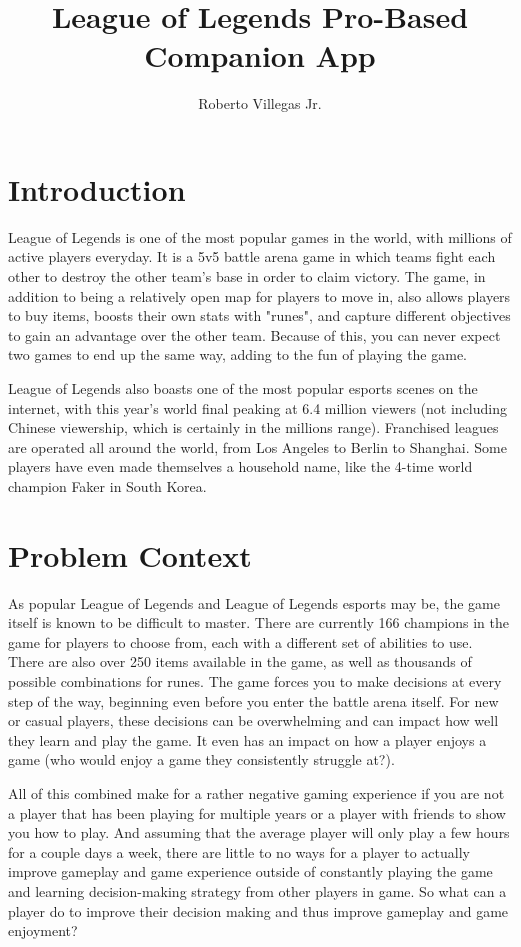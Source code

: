 \documentclass[10pt,twocolumn]{article}
\title{League of Legends Pro-Based Companion App}
\author{Roberto Villegas Jr.}
\affiliation{Occidental College}
\begin{document}
\maketitle

\section{Introduction}

League of Legends is one of the most popular games in the world, with millions of active players everyday.
It is a 5v5 battle arena game in which teams fight each other to destroy the other team's base in order to claim victory.
The game, in addition to being a relatively open map for players to move in, also allows players to buy items, boosts their own stats with "runes", and capture different objectives to gain an advantage over the other team.
Because of this, you can never expect two games to end up the same way, adding to the fun of playing the game.

League of Legends also boasts one of the most popular esports scenes on the internet, with this year's world final peaking at 6.4 million viewers (not including Chinese viewership, which is certainly in the millions range).
Franchised leagues are operated all around the world, from Los Angeles to Berlin to Shanghai.
Some players have even made themselves a household name, like the 4-time world champion Faker in South Korea.

\section{Problem Context}
As popular League of Legends and League of Legends esports may be, the game itself is known to be difficult to master.
There are currently 166 champions in the game for players to choose from, each with a different set of abilities to use.
There are also over 250 items available in the game, as well as thousands of possible combinations for runes.
The game forces you to make decisions at every step of the way, beginning even before you enter the battle arena itself.
For new or casual players, these decisions can be overwhelming and can impact how well they learn and play the game.
It even has an impact on how a player enjoys a game (who would enjoy a game they consistently struggle at?).

All of this combined make for a rather negative gaming experience if you are not a player that has been playing for multiple years or a player with friends to show you how to play.
And assuming that the average player will only play a few hours for a couple days a week, there are little to no ways for a player to actually improve gameplay and game experience outside of constantly playing the game and learning decision-making strategy from other players in game.
So what can a player do to improve their decision making and thus improve gameplay and game enjoyment?
\end{document}
